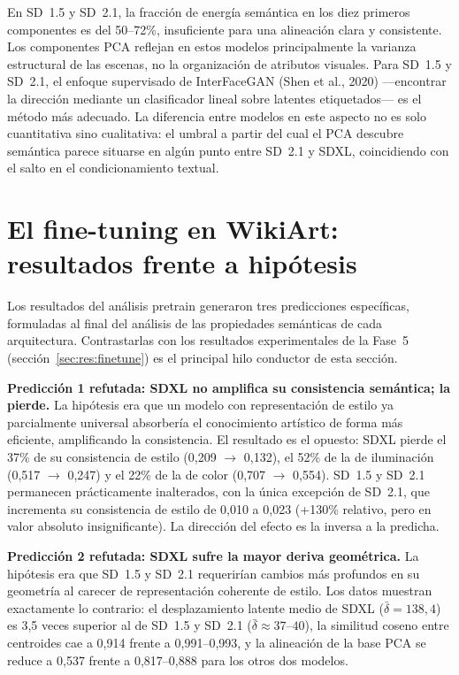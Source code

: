 \documentclass[12pt, a4paper, twoside]{book}
\begin{document}
En SD~1.5 y SD~2.1, la fracción de energía semántica en los diez primeros componentes es del 50--72\%, insuficiente para una alineación clara y consistente. Los componentes PCA reflejan en estos modelos principalmente la varianza estructural de las escenas, no la organización de atributos visuales. Para SD~1.5 y SD~2.1, el enfoque supervisado de InterFaceGAN (Shen et al., 2020) ---encontrar la dirección mediante un clasificador lineal sobre latentes etiquetados--- es el método más adecuado. La diferencia entre modelos en este aspecto no es solo cuantitativa sino cualitativa: el umbral a partir del cual el PCA descubre semántica parece situarse en algún punto entre SD~2.1 y SDXL, coincidiendo con el salto en el condicionamiento textual.

\section{El fine-tuning en WikiArt: resultados frente a hipótesis}
\label{sec:dis:finetune}

Los resultados del análisis pretrain generaron tres predicciones específicas, formuladas al final del análisis de las propiedades semánticas de cada arquitectura. Contrastarlas con los resultados experimentales de la Fase~5 (sección~\ref{sec:res:finetune}) es el principal hilo conductor de esta sección.

\textbf{Predicción 1 refutada: SDXL no amplifica su consistencia semántica; la pierde.} La hipótesis era que un modelo con representación de estilo ya parcialmente universal absorbería el conocimiento artístico de forma más eficiente, amplificando la consistencia. El resultado es el opuesto: SDXL pierde el 37\% de su consistencia de estilo (0,209 $\to$ 0,132), el 52\% de la de iluminación (0,517 $\to$ 0,247) y el 22\% de la de color (0,707 $\to$ 0,554). SD~1.5 y SD~2.1 permanecen prácticamente inalterados, con la única excepción de SD~2.1, que incrementa su consistencia de estilo de 0,010 a 0,023 (+130\% relativo, pero en valor absoluto insignificante). La dirección del efecto es la inversa a la predicha.

\textbf{Predicción 2 refutada: SDXL sufre la mayor deriva geométrica.} La hipótesis era que SD~1.5 y SD~2.1 requerirían cambios más profundos en su geometría al carecer de representación coherente de estilo. Los datos muestran exactamente lo contrario: el desplazamiento latente medio de SDXL ($\bar{\delta} = 138{,}4$) es 3,5 veces superior al de SD~1.5 y SD~2.1 ($\bar{\delta} \approx 37$--$40$), la similitud coseno entre centroides cae a 0,914 frente a 0,991--0,993, y la alineación de la base PCA se reduce a 0,537 frente a 0,817--0,888 para los otros dos modelos.
\end{document}
